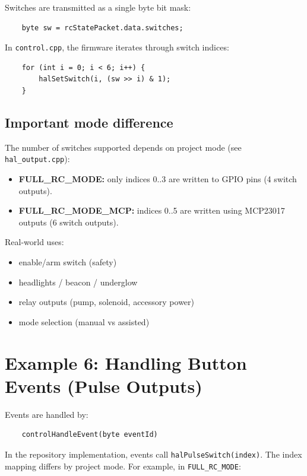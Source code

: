 Switches are transmitted as a single byte bit mask:

\begin{verbatim}
    byte sw = rcStatePacket.data.switches;
\end{verbatim}

In \texttt{control.cpp}, the firmware iterates through switch indices:

\begin{verbatim}
    for (int i = 0; i < 6; i++) {
        halSetSwitch(i, (sw >> i) & 1);
    }
\end{verbatim}

\subsection*{Important mode difference}
The number of switches supported depends on project mode (see \texttt{hal\_output.cpp}):

\begin{itemize}
    \item \textbf{FULL\_RC\_MODE:} only indices 0..3 are written to GPIO pins (4 switch outputs).
    \item \textbf{FULL\_RC\_MODE\_MCP:} indices 0..5 are written using MCP23017 outputs (6 switch outputs).
\end{itemize}

\noindent Real-world uses:
\begin{itemize}
    \item enable/arm switch (safety)
    \item headlights / beacon / underglow
    \item relay outputs (pump, solenoid, accessory power)
    \item mode selection (manual vs assisted)
\end{itemize}

\section{Example 6: Handling Button Events (Pulse Outputs)}
\label{sec:example-events}

Events are handled by:

\begin{verbatim}
    controlHandleEvent(byte eventId)
\end{verbatim}

In the repository implementation, events call \texttt{halPulseSwitch(index)}. The index mapping differs
by project mode. For example, in \texttt{FULL\_RC\_MODE}:

